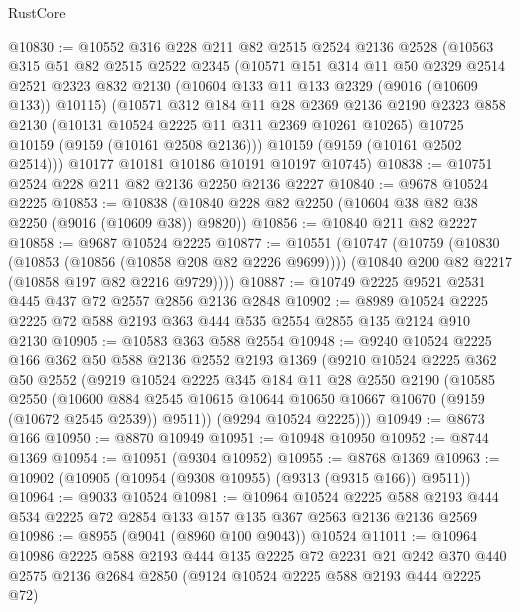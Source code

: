 \begin{lexlean}{RustCore}
\begin{coremodule}
@10830 := @10552
    @316
    @228
    @211
    @82
    @2515
    @2524
    @2136
    @2528
    (@10563
      @315
      @51
      @82
      @2515
      @2522
      @2345
      (@10571
        @151
        @314
        @11
        @50
        @2329
        @2514
        @2521
        @2323
        @832
        @2130
        (@10604 @133 @11 @133 @2329 (@9016 (@10609 @133)) @10115)
        (@10571
          @312
          @184
          @11
          @28
          @2369
          @2136
          @2190
          @2323
          @858
          @2130
          (@10131 @10524 @2225 @11 @311 @2369 @10261 @10265)
          @10725
          @10159
          (@9159 (@10161 @2508 @2136)))
        @10159
        (@9159 (@10161 @2502 @2514)))
      @10177
      @10181
      @10186
      @10191
      @10197
      @10745)
@10838 := @10751 @2524 @228 @211 @82 @2136 @2250 @2136 @2227
@10840 := @9678 @10524 @2225
@10853 := @10838 (@10840 @228 @82 @2250 (@10604 @38 @82 @38 @2250 (@9016 (@10609 @38)) @9820))
@10856 := @10840 @211 @82 @2227
@10858 := @9687 @10524 @2225
@10877 := @10551
    (@10747
      (@10759
        (@10830 (@10853 (@10856 (@10858 @208 @82 @2226 @9699))))
        (@10840 @200 @82 @2217 (@10858 @197 @82 @2216 @9729))))
@10887 := @10749 @2225 @9521 @2531 @445 @437 @72 @2557 @2856 @2136 @2848
@10902 := @8989 @10524 @2225 @2225 @72 @588 @2193 @363 @444 @535 @2554 @2855 @135 @2124 @910 @2130
@10905 := @10583 @363 @588 @2554
@10948 := @9240
    @10524
    @2225
    @166
    @362
    @50
    @588
    @2136
    @2552
    @2193
    @1369
    (@9210
      @10524
      @2225
      @362
      @50
      @2552
      (@9219
        @10524
        @2225
        @345
        @184
        @11
        @28
        @2550
        @2190
        (@10585
          @2550
          (@10600 @884 @2545 @10615 @10644 @10650 @10667 @10670 (@9159 (@10672 @2545 @2539)) @9511))
        (@9294 @10524 @2225)))
@10949 := @8673 @166
@10950 := @8870 @10949
@10951 := @10948 @10950
@10952 := @8744 @1369
@10954 := @10951 (@9304 @10952)
@10955 := @8768 @1369
@10963 := @10902 (@10905 (@10954 (@9308 @10955) (@9313 (@9315 @166)) @9511))
@10964 := @9033 @10524
@10981 := @10964
    @10524
    @2225
    @588
    @2193
    @444
    @534
    @2225
    @72
    @2854
    @133
    @157
    @135
    @367
    @2563
    @2136
    @2136
    @2569
@10986 := @8955 (@9041 (@8960 @100 @9043)) @10524
@11011 := @10964
    @10986
    @2225
    @588
    @2193
    @444
    @135
    @2225
    @72
    @2231
    @21
    @242
    @370
    @440
    @2575
    @2136
    @2684
    @2850
    (@9124 @10524 @2225 @588 @2193 @444 @2225 @72)

\end{coremodule}
\end{lexlean}
